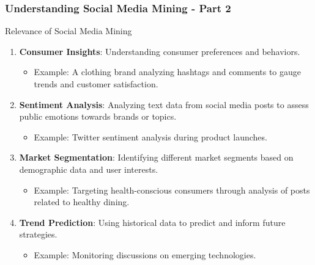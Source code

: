 \documentclass{beamer}
\begin{document}
\begin{frame}[fragile]
    \frametitle{Understanding Social Media Mining - Part 2}
    \begin{block}{Relevance of Social Media Mining}
        \begin{enumerate}
            \item \textbf{Consumer Insights}: Understanding consumer preferences and behaviors.
                \begin{itemize}
                    \item Example: A clothing brand analyzing hashtags and comments to gauge trends and customer satisfaction.
                \end{itemize}
            
            \item \textbf{Sentiment Analysis}: Analyzing text data from social media posts to assess public emotions towards brands or topics.
                \begin{itemize}
                    \item Example: Twitter sentiment analysis during product launches.
                \end{itemize}
            
            \item \textbf{Market Segmentation}: Identifying different market segments based on demographic data and user interests.
                \begin{itemize}
                    \item Example: Targeting health-conscious consumers through analysis of posts related to healthy dining.
                \end{itemize}
            
            \item \textbf{Trend Prediction}: Using historical data to predict and inform future strategies.
                \begin{itemize}
                    \item Example: Monitoring discussions on emerging technologies.
                \end{itemize}
        \end{enumerate}
    \end{block}
\end{frame}
\end{document}
